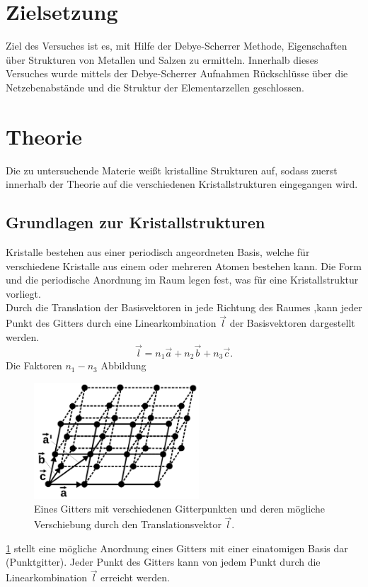 \section{Zielsetzung}
Ziel des Versuches ist es, mit Hilfe der Debye-Scherrer Methode, Eigenschaften
über Strukturen von Metallen und Salzen zu ermitteln. Innerhalb dieses
Versuches wurde mittels der Debye-Scherrer Aufnahmen Rückschlüsse über die
Netzebenabstände und die Struktur der Elementarzellen geschlossen.


\section{Theorie}
\label{sec:Theorie}
Die zu untersuchende Materie weißt kristalline Strukturen auf, sodass zuerst
innerhalb der Theorie auf die verschiedenen Kristallstrukturen eingegangen wird.\\
\subsection{Grundlagen zur Kristallstrukturen}
Kristalle bestehen aus einer periodisch angeordneten Basis, welche für
verschiedene Kristalle aus einem oder mehreren Atomen bestehen kann.
Die Form und die periodische Anordnung im Raum legen fest,
was für eine Kristallstruktur vorliegt. \\
Durch die Translation der Basisvektoren in jede Richtung des Raumes
,kann jeder Punkt des Gitters durch eine Linearkombination $\vec l$
der Basisvektoren dargestellt werden.
$$ \vec l = n_1 \vec a + n_2 \vec b + n_3 \vec c .$$
Die Faktoren $n_1-n_3 $
Abbildung
\begin{figure}
    \centering
    \includegraphics[width=0.55\textwidth]{ressources/gitter.png}
    \caption{Eines Gitters mit verschiedenen Gitterpunkten und deren mögliche
    Verschiebung durch den Translationsvektor $\vec l$\cite{skript}.}
    \label{fig_gitter}
\end{figure}
\ref{fig_gitter}
 stellt eine mögliche Anordnung eines Gitters mit
einer einatomigen Basis dar (Punktgitter). Jeder Punkt des Gitters kann von
jedem Punkt durch die Linearkombination $\vec l$ erreicht werden.

